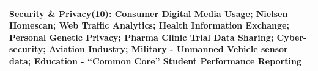 \documentclass{acm_proc_article-sp}
\begin{document}
\begin{table}
\begin{tabular}{|p{8cm}|}
\textbf{Security \& Privacy(10):} Consumer Digital Media Usage; Nielsen
Homescan; Web Traffic Analytics; Health Information Exchange; Personal
Genetic Privacy; Pharma Clinic Trial Data Sharing; Cyber-security;
Aviation Industry; Military - Unmanned Vehicle sensor data; Education
- ``Common Core'' Student Performance Reporting
\\ \hline
\end{tabular}
\end{table}




\end{document}
